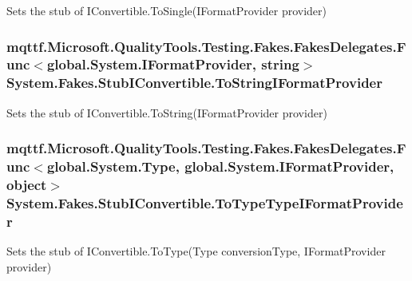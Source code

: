 Sets the stub of I\-Convertible.\-To\-Single(\-I\-Format\-Provider provider)

\hypertarget{class_system_1_1_fakes_1_1_stub_i_convertible_a37269ecefae1604359d7c41f36041b15}{
\subsubsection[{To\-String\-I\-Format\-Provider}]{\setlength{\rightskip}{0pt plus 5cm}mqttf.\-Microsoft.\-Quality\-Tools.\-Testing.\-Fakes.\-Fakes\-Delegates.\-Func$<$global.\-System.\-I\-Format\-Provider, string$>$ System.\-Fakes.\-Stub\-I\-Convertible.\-To\-String\-I\-Format\-Provider}}\label{class_system_1_1_fakes_1_1_stub_i_convertible_a37269ecefae1604359d7c41f36041b15}


Sets the stub of I\-Convertible.\-To\-String(\-I\-Format\-Provider provider)

\hypertarget{class_system_1_1_fakes_1_1_stub_i_convertible_a442dca9a881e39666e27f6a073422e64}{
\subsubsection[{To\-Type\-Type\-I\-Format\-Provider}]{\setlength{\rightskip}{0pt plus 5cm}mqttf.\-Microsoft.\-Quality\-Tools.\-Testing.\-Fakes.\-Fakes\-Delegates.\-Func$<$global.\-System.\-Type, global.\-System.\-I\-Format\-Provider, object$>$ System.\-Fakes.\-Stub\-I\-Convertible.\-To\-Type\-Type\-I\-Format\-Provider}}\label{class_system_1_1_fakes_1_1_stub_i_convertible_a442dca9a881e39666e27f6a073422e64}


Sets the stub of I\-Convertible.\-To\-Type(\-Type conversion\-Type, I\-Format\-Provider provider)

